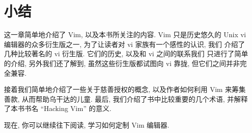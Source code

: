 \section{小结}
\label{sec:getting_started_with_vim_summary}
这一章简单地介绍了 Vim, 以及本书所关注的内容. Vim 只是历史悠久的 Unix 
vi 编辑器的众多衍生版之一, 为了让读者对 vi 家族有一个感性的认识, 我们 
介绍了几种比较著名的 vi 衍生版. 它们的历史, 以及和 vi 之间的联系我们
只进行了简单的介绍, 另外我们还了解到, 虽然这些衍生版都试图向 vi 靠拢,
但它们之间并非完全兼容.

接着我们简单地介绍了一些关于慈善授权的概念, 以及作者如何利用 Vim 来筹集
善款, 从而帮助乌干达的儿童. 最后, 我们介绍了书中比较重要的几个术语, 
并解释了本书书名 ``Hacking Vim'' 的意义.

现在, 你可以继续往下阅读, 学习如何定制 Vim 编辑器.
